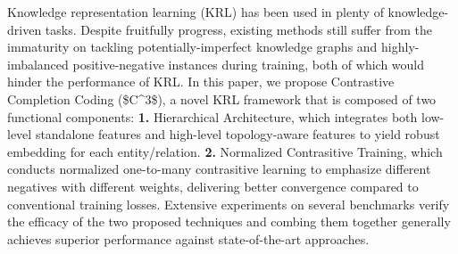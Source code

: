 Knowledge representation learning (KRL) has been used in plenty of knowledge-driven tasks. Despite fruitfully progress, existing methods still suffer from the immaturity on tackling potentially-imperfect knowledge graphs and highly-imbalanced positive-negative instances during training, both of which would hinder the performance of KRL. In this paper, we propose Contrastive Completion Coding (\$C^3\$), a novel KRL framework that is composed of two functional components: \textbf{1.} Hierarchical Architecture, which integrates both low-level standalone features and high-level topology-aware features to yield robust embedding for each entity/relation. \textbf{2.} Normalized Contrasitive Training, which conducts normalized one-to-many contrasitive learning to emphasize different negatives with different weights, delivering better convergence compared to conventional training losses. Extensive experiments on several benchmarks verify the efficacy of the two proposed techniques and combing them together generally achieves superior performance against state-of-the-art approaches.
